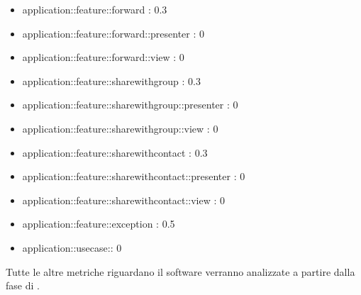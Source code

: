 \begin{itemize}
\item application::feature::forward : 0.3
\item application::feature::forward::presenter : 0
\item application::feature::forward::view : 0
\item application::feature::sharewithgroup : 0.3
\item application::feature::sharewithgroup::presenter : 0
\item application::feature::sharewithgroup::view : 0
\item application::feature::sharewithcontact : 0.3
\item application::feature::sharewithcontact::presenter : 0 
\item application::feature::sharewithcontact::view : 0
\item application::feature::exception : 0.5
\item application::usecase:: 0

\end{itemize}

Tutte le altre metriche riguardano il software verranno analizzate a partire dalla fase di \COD.
